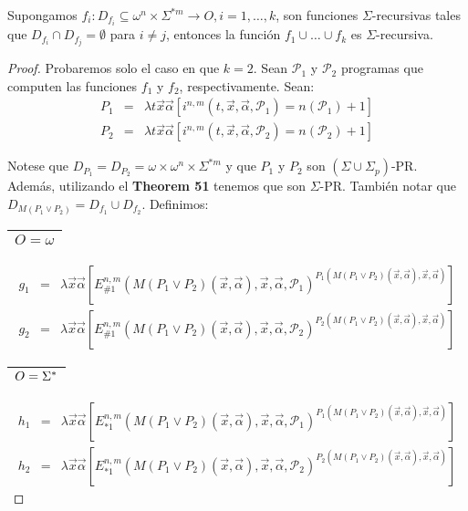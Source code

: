   \begin{lemma}
    \PN Supongamos $f_{i}: D_{f_{i}} \subseteq \omega^{n}\times \Sigma^{\ast m} \rightarrow O, i=1, \dotsc, k$, son
    funciones $\Sigma$-recursivas tales que $D_{f_{i}} \cap D_{f_{j}} = \emptyset$ para $i \neq j$, entonces la función
    $f_{1} \cup \dotsc \cup f_{k}$ es $\Sigma$-recursiva.
  \end{lemma}
  \begin{proof}
    \PN Probaremos solo el caso en que $k = 2$. Sean $\mathcal{P}_{1}$ y $ \mathcal{P}_{2}$ programas que computen las
    funciones $f_{1}$ y $f_{2}$, respectivamente. Sean:
    \begin{eqnarray*}
      P_{1} &=& \lambda t\vec{x}\vec{\alpha}\left[i^{n,m}(t,\vec{x},\vec{\alpha},\mathcal{P}_{1}) = n(\mathcal{P}_{1}) +
        1\right] \\
      P_{2} &=& \lambda t\vec{x}\vec{\alpha}\left[i^{n,m}(t,\vec{x},\vec{\alpha},\mathcal{P}_{2}) = n(\mathcal{P}_{2}) +
        1\right]
    \end{eqnarray*}

    \PN Notese que $D_{P_{1}} = D_{P_{2}} = \omega \times \omega^{n} \times \Sigma^{\ast m}$ y que $P_{1}$ y $P_{2}$ son
    $(\Sigma \cup \Sigma_{p})$-PR. Además, utilizando el \textbf{Theorem 51} tenemos que son $\Sigma$-PR. También notar
    que $D_{M(P_{1} \vee P_{2})} = D_{f_{1}} \cup D_{f_{2}}$. Definimos:

    \PN \begin{tabular}{|c|} \hline $O = \omega$ \\\hline \end{tabular}
    \begin{eqnarray*}
      g_{1} & =& \lambda \vec{x}\vec{\alpha}\left[E_{\# 1}^{n,m} (M \left(P_{1} \vee P_{2}\right)(\vec{x},
        \vec{\alpha}),\vec{x},\vec{\alpha},\mathcal{P}_{1})^{P_{1} (M (P_{1} \vee P_{2})(\vec{x},\vec{\alpha}),\vec{x},
        \vec{\alpha})}\right] \\
      g_{2} & =& \lambda \vec{x}\vec{\alpha}\left[E_{\# 1}^{n,m} (M \left(P_{1} \vee P_{2}\right)(\vec{x},
        \vec{\alpha}),\vec{x},\vec{\alpha},\mathcal{P}_{2})^{P_{2} (M (P_{1} \vee P_{2})(\vec{x},\vec{\alpha}),\vec{x},
        \vec{\alpha})}\right]
    \end{eqnarray*}

    \PN \begin{tabular}{|c|} \hline $O = \Sigma^{\ast}$ \\\hline \end{tabular}
    \begin{eqnarray*}
      h_{1} & =& \lambda \vec{x}\vec{\alpha}\left[E_{\ast 1}^{n,m} (M \left(P_{1} \vee P_{2}\right)(\vec{x},
        \vec{\alpha}),\vec{x},\vec{\alpha},\mathcal{P}_{1})^{P_{1} (M (P_{1} \vee P_{2})(\vec{x},\vec{\alpha}),\vec{x},
        \vec{\alpha})}\right] \\
      h_{2} & =& \lambda \vec{x}\vec{\alpha}\left[E_{\ast 1}^{n,m} (M \left(P_{1} \vee P_{2}\right)(\vec{x},
        \vec{\alpha}),\vec{x},\vec{\alpha},\mathcal{P}_{2})^{P_{2} (M (P_{1} \vee P_{2})(\vec{x},\vec{\alpha}),\vec{x},
        \vec{\alpha})}\right]
    \end{eqnarray*}


\end{proof}
